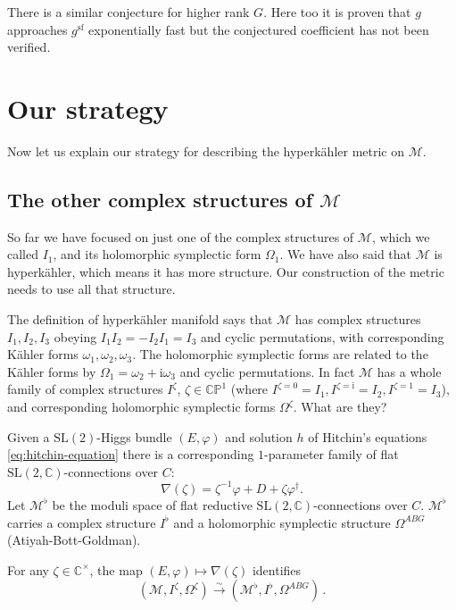 \documentclass[12pt,letterpaper,reqno]{article}
\numberwithin{equation}{section}
\begin{document}
There is a similar conjecture for higher rank
$G$. Here too it is proven that $g$ approaches
$g^{\mathrm{sf}}$ exponentially fast
\cite{fredrickson2020exponential} but the conjectured coefficient has not been verified.

\section{Our strategy}

Now let us explain our strategy for describing the hyperk\"ahler metric on $\mathcal M$.

\subsection{The other complex structures of \texorpdfstring{$\mathcal M$}{M}}

So far we have focused on just one of the complex
structures of $\mathcal M$, which we called $I_1$,
and its holomorphic symplectic form $\Omega_1$.
We have also said that $\mathcal M$ is hyperk\"ahler, which means it has more structure.
Our construction of the metric needs to use all that structure.

The definition of hyperk\"ahler manifold says that 
$\mathcal M$ has complex structures $I_1, I_2, I_3$ obeying
$I_1 I_2 = -I_2 I_1 = I_3$ and cyclic permutations,
with corresponding K\"ahler forms $\omega_1, \omega_2, \omega_3$.
The holomorphic symplectic forms are related to the
K\"ahler forms by $\Omega_1 = \omega_2 + \mathrm i \omega_3$ 
and cyclic permutations.
In fact $\mathcal M$ has a whole family of complex structures 
$I^\zeta$, $\zeta \in \mathbb C\mathbb P^1$ (where
$I^{\zeta=0} = I_1, I^{\zeta = \mathrm i} = I_2, I^{\zeta = 1} = I_3$),
and corresponding holomorphic symplectic forms $\Omega^\zeta$.
What are they?

Given a $\mathrm{SL}(2)$-Higgs bundle $(E,\varphi)$ and 
solution $h$ of Hitchin's equations \eqref{eq:hitchin-equation}
there is a corresponding $1$-parameter family of flat
$\mathrm{SL}(2,\mathbb C)$-connections over $C$:
\begin{equation}
  \nabla(\zeta) = \zeta^{-1} \varphi + D + \zeta \varphi^\dagger.
\end{equation}
Let $\mathcal M^\flat$
be the moduli space of flat reductive 
$\mathrm{SL}(2,\mathbb C)$-connections over $C$. 
$\mathcal M^\flat$ carries a complex structure $I^\flat$
and a holomorphic symplectic
structure $\Omega^{ABG}$ (Atiyah-Bott-Goldman).

\begin{prop} \label{prop:generic-structures-flat-connections} For any $\zeta \in \mathbb C^\times$,
the map $(E,\varphi) \mapsto \nabla(\zeta)$ identifies
\begin{equation}
  (\mathcal M, I^\zeta, \Omega^\zeta) \xrightarrow\sim (\mathcal M^\flat, I^\flat, \Omega^{ABG}) \, .
\end{equation}
\end{prop}
\end{document}
